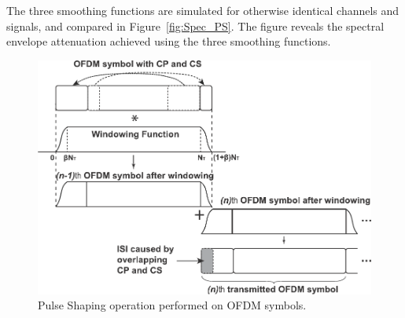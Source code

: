 The three smoothing functions are simulated for otherwise identical channels and signals, and compared in Figure~\ref{fig:Spec_PS}. The figure reveals the spectral envelope attenuation achieved using the three smoothing functions. %

\begin{figure}[t]
    \centerline{\includegraphics [width=0.7\columnwidth] {Figures/w-ofdm} }
	\vspace{-2mm}
    \caption{Pulse Shaping operation performed on OFDM symbols.}
    \label{fig:PS}
\end{figure}


